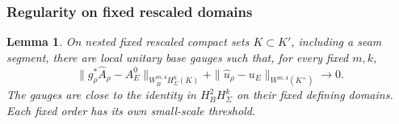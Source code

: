 \documentclass[11pt]{amsart}
\newtheorem{lemma}[theorem]{Lemma}
\theoremstyle{definition}
\theoremstyle{remark}
\theoremstyle{plain}
\begin{document}
\subsubsection{Regularity on fixed rescaled domains}

\begin{lemma}\label{lem:constructed-rescaled-regularity}
On nested fixed rescaled compact sets $K\subset K'$, including a seam
segment, there are local unitary base gauges such that, for every fixed
$m,k$,
\begin{equation}\label{eq:constructed-rescaled-regularity}
 \|g_\rho^*\widehat A_\rho-A_E^0\|_{W^{m,4}_BH^k_\Sigma(K)}
       +\|\widehat u_\rho-u_E\|_{W^{m,4}(K^+)}\longrightarrow0.
\end{equation}
The gauges are close to the identity in $H^2_BH^k_\Sigma$ on their
fixed defining domains. Each fixed order has its own small-scale
threshold.
\end{lemma}
\end{document}
